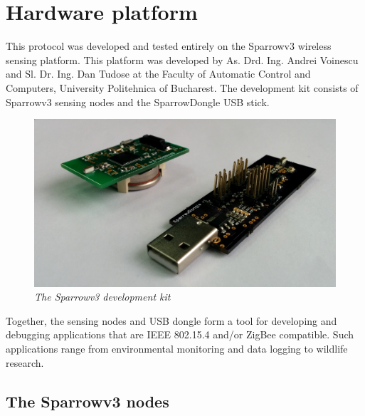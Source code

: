 
\chapter{Hardware platform}

This protocol was developed and tested entirely on the Sparrowv3 wireless
sensing platform. This platform was developed by As. Drd. Ing. Andrei Voinescu
and Sl. Dr. Ing. Dan Tudose at the Faculty of Automatic Control and Computers,
University Politehnica of Bucharest. The development kit consists of Sparrowv3
sensing nodes and the SparrowDongle USB stick.

\begin{figure}[ht]
	\begin{center}
		\includegraphics[width=\textwidth]{img/sparrowv3_kit.jpg}
	\end{center}
	\caption{\small \itshape{The Sparrowv3 development kit}}
\end{figure}

Together, the sensing nodes and USB dongle form a tool for developing and
debugging applications that are IEEE 802.15.4\cite{1655947} and/or
ZigBee\cite{Farahani:2008:ZWN:1457417} compatible. Such applications range from
environmental monitoring and data logging to wildlife research.

\section{The Sparrowv3 nodes}

